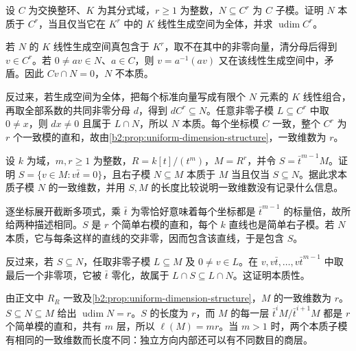 \begin{optionalexercise}\label{b2:ex:19-essential-lattice}
	设 \(C\) 为交换整环、\(K\) 为其分式域，\(r\ge1\) 为整数，\(N\subseteq C^r\) 为 \(C\) 子模。证明 \(N\) 本质于 \(C^r\)，当且仅当它在 \(K^r\) 中的 \(K\) 线性生成空间为全体，并求 \(\operatorname{udim}C^r\)。
\end{optionalexercise}
\begin{solution}
	若 \(N\) 的 \(K\) 线性生成空间真包含于 \(K^r\)，取不在其中的非零向量，清分母后得到 \(v\in C^r\)。若 \(0\ne av\in N\)、\(a\in C\)，则 \(v=a^{-1}(av)\) 又在该线性生成空间中，矛盾。因此 \(Cv\cap N=0\)，\(N\) 不本质。

	反过来，若生成空间为全体，把每个标准向量写成有限个 \(N\) 元素的 \(K\) 线性组合，再取全部系数的共同非零分母 \(d\)，得到 \(dC^r\subseteq N\)。任意非零子模 \(L\subseteq C^r\) 中取 \(0\ne x\)，则 \(dx\ne0\) 且属于 \(L\cap N\)，所以 \(N\) 本质。每个坐标模 \(C\) 一致，整个 \(C^r\) 为 \(r\) 个一致模的直和，故由\cref{b2:prop:uniform-dimension-structure}，一致维数为 \(r\)。
\end{solution}

\begin{optionalexercise}\label{b2:ex:19-uniform-versus-length}
	设 \(k\) 为域，\(m,r\ge1\) 为整数，\(R=k[t]/(t^m)\)，\(M=R^r\)，并令 \(S=\bar t^{m-1}M\)。证明 \(S=\{v\in M:v\bar t=0\}\)，且右子模 \(N\subseteq M\) 本质于 \(M\) 当且仅当 \(S\subseteq N\)。据此求本质子模 \(N\) 的一致维数，并用 \(S,M\) 的长度比较说明一致维数没有记录什么信息。
\end{optionalexercise}
\begin{solution}
	逐坐标展开截断多项式，乘 \(\bar t\) 为零恰好意味着每个坐标都是 \(\bar t^{m-1}\) 的标量倍，故所给两种描述相同。\(S\) 是 \(r\) 个简单右模的直和，每个 \(k\) 直线也是简单右子模。若 \(N\) 本质，它与每条这样的直线的交非零，因而包含该直线，于是包含 \(S\)。

	反过来，若 \(S\subseteq N\)，任取非零子模 \(L\subseteq M\) 及 \(0\ne v\in L\)。在 \(v,v\bar t,\ldots,v\bar t^{m-1}\) 中取最后一个非零项，它被 \(\bar t\) 零化，故属于 \(L\cap S\subseteq L\cap N\)。这证明本质性。

	由正文中 \(R_R\) 一致及\cref{b2:prop:uniform-dimension-structure}，\(M\) 的一致维数为 \(r\)。\(S\subseteq N\subseteq M\) 给出 \(\operatorname{udim}N=r\)。\(S\) 的长度为 \(r\)，而 \(M\) 的每一层 \(\bar t^iM/\bar t^{i+1}M\) 都是 \(r\) 个简单模的直和，共有 \(m\) 层，所以 \(\ell(M)=mr\)。当 \(m>1\) 时，两个本质子模有相同的一致维数而长度不同：独立方向内部还可以有不同数目的商层。
\end{solution}

